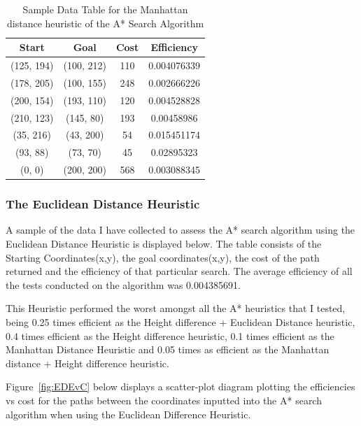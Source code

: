 \documentclass[11pt,oneside]{article}
\begin{document}
    \begin{table}[H]
    \centering
    \begin{tabular}{|c|c|c|c|}
        Start        & Goal       & Cost & Efficiency \\ \hline
        (125, 194)   & (100, 212) & 110 & 0.004076339 \\
        (178, 205)   & (100, 155) & 248 & 0.002666226 \\
        (200, 154)   & (193, 110) & 120 & 0.004528828 \\
        (210, 123)   & (145, 80)  & 193 & 0.00458986 \\
        (35, 216)    & (43, 200)  & 54 & 0.015451174 \\
        (93, 88)     & (73, 70)   & 45 & 0.02895323 \\
        (0, 0)       & (200, 200) & 568 & 0.003088345 \\
    \end{tabular}
    \caption{Sample Data Table for the Manhattan distance heuristic of the A* Search Algorithm}
    \label{tab:my_label}
\end{table}

\subsubsection{The Euclidean Distance Heuristic}

A sample of the data I have collected to assess the A* search algorithm using the Euclidean Distance Heuristic is displayed below. The table consists of the Starting Coordinates(x,y), the goal coordinates(x,y), the cost of the path returned and the efficiency of that particular search. The average efficiency of all the tests conducted on the algorithm was 0.004385691. 

This Heuristic performed the worst amongst all the A* heuristics that I tested, being 0.25 times efficient as the Height difference + Euclidean Distance heuristic, 0.4 times efficient as the Height difference heuristic, 0.1  times efficient as the Manhattan Distance Heuristic and 0.05 times as efficient as the Manhattan distance + Height difference heuristic. 

Figure~\ref{fig:EDEvC} below displays a scatter-plot diagram plotting the efficiencies vs cost for the paths between the coordinates inputted into the A* search algorithm when using the Euclidean Difference Heuristic.
\end{document}
